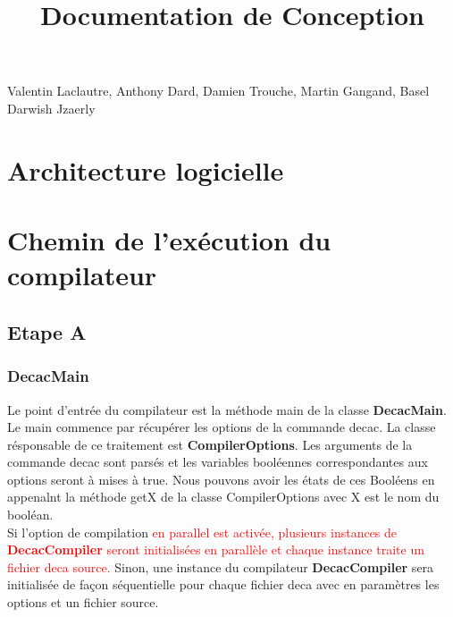 \documentclass[12pt, a4paper, one side]{article}
\title{Documentation de Conception}
\author{}
\date{}
\begin{document}
    \maketitle

    \begin{center}
        Valentin Laclautre, Anthony Dard, Damien Trouche, Martin Gangand, Basel Darwish Jzaerly
    \end{center}

    \tableofcontents
    \section{Architecture logicielle}
    \section{Chemin de l'exécution du compilateur}
    \subsection{Etape A}

    \subsubsection{DecacMain}
    Le point d'entrée du compilateur est la méthode main de la classe \textbf {DecacMain}. Le main commence par récupérer les options de la commande decac. La classe résponsable de ce traitement est \textbf{CompilerOptions}. Les arguments de la commande decac sont parsés et les variables booléennes correspondantes aux options seront à mises à true. Nous pouvons avoir les états de ces Booléens en appenalnt la méthode getX de la classe CompilerOptions avec X est le nom du booléan.
    \\
    Si l'option de compilation {\textcolor{red}{ en parallel est activée, plusieurs instances de \textbf{DecacCompiler} seront initialisées en parallèle et chaque instance traite un fichier deca source.}}
    Sinon, une instance du compilateur \textbf{DecacCompiler} sera initialisée de façon séquentielle pour chaque fichier deca avec en paramètres les options et un fichier source.
\end{document}
